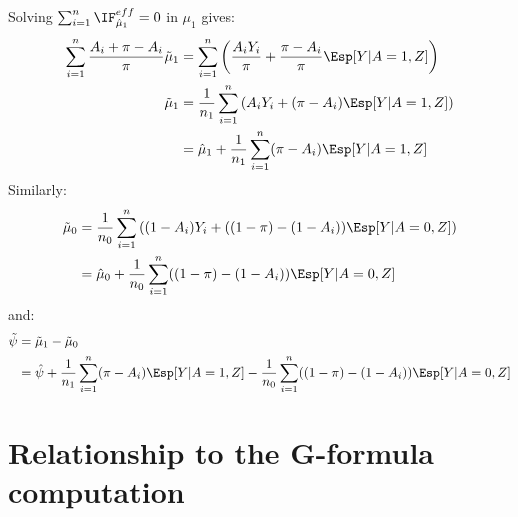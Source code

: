\documentclass[12pt]{article}
\begin{document}
Solving \(\sum_{i=1}^n \IF^{eff}_{\hat{\mu}_1} = 0\) in \(\mu_1\) gives:
\begin{align*}
\sum_{i=1}^n\frac{A_i + \pi - A_i }{\pi}\tilde{\mu}_1 &= \sum_{i=1}^n \left( \frac{A_i Y_i}{\pi} + \frac{\pi-A_i}{\pi} \Esp[Y|A=1,Z] \right)\\
\tilde{\mu}_1 &= \frac{1}{n_1}\sum_{i=1}^n \left( A_i Y_i + (\pi-A_i) \Esp[Y|A=1,Z] \right) \\
              &= \hat{\mu}_1 + \frac{1}{n_1}\sum_{i=1}^n (\pi-A_i) \Esp[Y|A=1,Z]
\end{align*}
Similarly:
\begin{align*}
\tilde{\mu}_0 &= \frac{1}{n_0}\sum_{i=1}^n \left( (1-A_i) Y_i + ((1-\pi)-(1-A_i)) \Esp[Y|A=0,Z] \right) \\
              &= \hat{\mu}_0 + \frac{1}{n_0}\sum_{i=1}^n ((1-\pi)-(1-A_i)) \Esp[Y|A=0,Z]
\end{align*}
and:
\begin{align*}
\tilde{\psi} &= \tilde{\mu}_1 - \tilde{\mu}_0 \\
              &= \hat{\psi} + \frac{1}{n_1}\sum_{i=1}^n (\pi-A_i) \Esp[Y|A=1,Z] - \frac{1}{n_0}\sum_{i=1}^n ((1-\pi)-(1-A_i)) \Esp[Y|A=0,Z]
\end{align*}

\section{Relationship to the G-formula computation}
\label{sec:orgedb8cbd}
\end{document}
